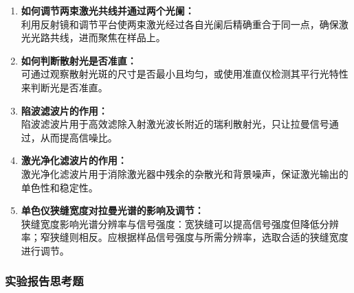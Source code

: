\documentclass[12pt,a4paper,UTF8]{ctexart}
\begin{document}
\begin{enumerate}
	\item \textbf{如何调节两束激光共线并通过两个光阑：}\\
	利用反射镜和调节平台使两束激光经过各自光阑后精确重合于同一点，确保激光光路共线，进而聚焦在样品上。
  
	\item \textbf{如何判断散射光是否准直：}\\
	可通过观察散射光斑的尺寸是否最小且均匀，或使用准直仪检测其平行光特性来判断光是否准直。
  
	\item \textbf{陷波滤波片的作用：}\\
	陷波滤波片用于高效滤除入射激光波长附近的瑞利散射光，只让拉曼信号通过，从而提高信噪比。
  
	\item \textbf{激光净化滤波片的作用：}\\
	激光净化滤波片用于消除激光器中残余的杂散光和背景噪声，保证激光输出的单色性和稳定性。
  
	\item \textbf{单色仪狭缝宽度对拉曼光谱的影响及调节：}\\
	狭缝宽度影响光谱分辨率与信号强度：宽狭缝可以提高信号强度但降低分辨率；窄狭缝则相反。应根据样品信号强度与所需分辨率，选取合适的狭缝宽度进行调节。
\end{enumerate}
  
\subsubsection*{实验报告思考题}
  
\end{document}
